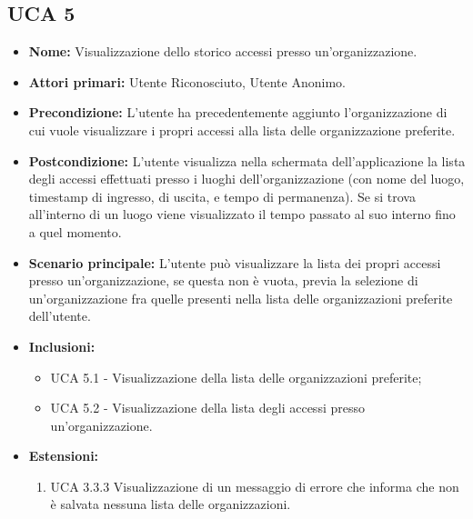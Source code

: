 \subsection{UCA 5}
\begin{itemize}
    \item \textbf{Nome:} Visualizzazione dello storico accessi presso un'organizzazione.
    \item \textbf{Attori primari:} Utente Riconosciuto, Utente Anonimo.
    \item \textbf{Precondizione:} L’utente ha precedentemente aggiunto l’organizzazione di cui vuole visualizzare i propri accessi alla lista delle organizzazione preferite.
    \item \textbf{Postcondizione:} L’utente visualizza nella schermata dell’applicazione la lista degli accessi effettuati presso i luoghi dell’organizzazione (con nome del luogo, timestamp di ingresso, di uscita, e tempo di permanenza).
    Se si trova all'interno di un luogo viene visualizzato il tempo passato al suo interno fino a quel momento.
    \item \textbf{Scenario principale:} L'utente può visualizzare la lista dei propri accessi presso un'organizzazione, se questa non è vuota, previa la selezione di un'organizzazione fra quelle presenti nella lista delle organizzazioni preferite dell'utente.
    \item \textbf{Inclusioni:}
    \begin{itemize}
        \item UCA 5.1 - Visualizzazione della lista delle organizzazioni preferite;
        \item UCA 5.2 - Visualizzazione della lista degli accessi presso un'organizzazione.
    \end{itemize}
    \item \textbf{Estensioni:}
    \begin{enumerate}
        \item UCA 3.3.3 Visualizzazione di un messaggio di errore che informa che non è salvata nessuna lista delle organizzazioni.	
    \end{enumerate}	
\end{itemize}


